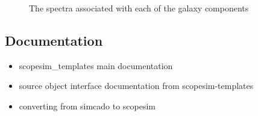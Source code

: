 \begin{figure}[H]
\noindent{}\label{fig-scopesim-templates-galaxy-spectra}

\caption{The spectra associated with each of the galaxy components}
\end{figure}


\subsection{Documentation%
  \label{documentation}%
}

\begin{itemize}
\item scopesim\_templates main documentation

\item source object interface documentation from scopesim-templates

\item converting from simcado to scopesim
\end{itemize}
